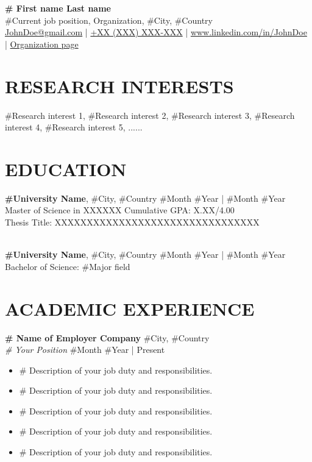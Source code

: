 \documentclass[a4paper,9pt]{extarticle}
\begin{document}
\pagestyle{fancy}
\renewcommand{\headrulewidth}{0pt}
\fancyhead{}
\thispagestyle{empty} %

\begin{flushleft}
\textbf{\LARGE \# First name Last name}\\[2pt] %
\#Current job position, Organization, \#City, \#Country
\\ \href{mailto:JohnDoe@gmail.com}{JohnDoe@gmail.com} | \href{tel:00XXXXXXXXX}{+XX (XXX) XXX-XXX} | \href{https://www.linkedin.com/in/JohnDoe}{www.linkedin.com/in/JohnDoe} | \href{https://JohnDoe/en/staff/single/59}{Organization page} %
\end{flushleft}

\section*{RESEARCH INTERESTS}
\noindent
\#Research interest 1, \#Research interest 2, \#Research interest 3, \#Research interest 4, \#Research interest 5, ......
\section*{EDUCATION}
\noindent
\textbf{\#University Name}, \#City, \#Country \hfill \#Month \#Year | \#Month \#Year\\ %
Master of Science in XXXXXX \hfill Cumulative GPA: X.XX/4.00 \\ %
Thesis Title: XXXXXXXXXXXXXXXXXXXXXXXXXXXXXXXX%

\noindent\\
\textbf{\#University Name},  \#City, \#Country \hfill \#Month \#Year | \#Month \#Year\\ %
Bachelor of Science: \#Major field  %

\section*{ACADEMIC EXPERIENCE}
\noindent
\textbf{\# Name of Employer Company} \hfill \#City, \#Country\\ %
\textit{\# Your Position} \hfill \#Month \#Year | Present %
\begin{itemize}
    \item \# Description of your job duty and responsibilities.
    \item \# Description of your job duty and responsibilities.
    \item \# Description of your job duty and responsibilities.
    \item \# Description of your job duty and responsibilities.
    \item \# Description of your job duty and responsibilities.
\end{itemize}
\end{document}
